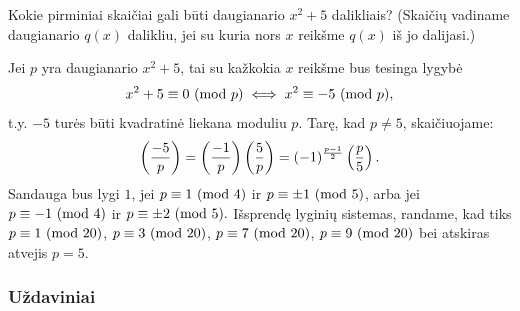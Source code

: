 \begin{pavnr}
  Kokie pirminiai skaičiai gali būti daugianario $x^2 + 5$ dalikliais?
  (Skaičių vadiname daugianario $q(x)$ dalikliu, jei su kuria nors $x$
  reikšme $q(x)$ iš jo dalijasi.)
\end{pavnr}

\begin{sprendimas}
  Jei $p$ yra daugianario $x^2 + 5$, tai su kažkokia $x$ reikšme bus
  tesinga lygybė $$x^2 + 5 \equiv 0 \ (\text{mod } p) \iff x^2 \equiv -5 \ (\text{mod } p),$$ t.y.
  $-5$ turės būti kvadratinė liekana moduliu $p$. Tarę, kad $p\neq 5$,
  skaičiuojame:
  $$\left(\frac{-5}{p}\right)=\left(\frac{-1}{p}\right)\left(\frac{5}{p}\right)=(-1)^\frac{p-1}{2}\left(\frac{p}{5}\right).$$
  Sandauga bus lygi $1$, jei $p\equiv 1\ (\text{mod } 4)$ ir $p\equiv \pm1 \ (\text{mod } 5)$, arba
  jei $p\equiv -1 \ (\text{mod } 4)$ ir $p \equiv \pm2 \ (\text{mod } 5).$ Išsprendę lyginių
  sistemas, randame, kad tiks $p\equiv 1 \ (\text{mod } 20)$, $p\equiv 3 \ (\text{mod } 20)$,
  $p\equiv 7 \ (\text{mod } 20)$, $p\equiv 9 \ (\text{mod } 20)$ bei atskiras atvejis $p=5$.
\end{sprendimas}

\subsubsection{Uždaviniai}


